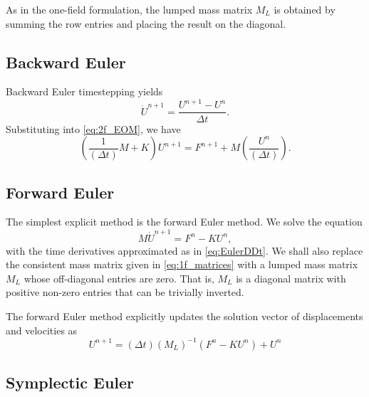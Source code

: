 \documentclass[12pt]{article}
\newcommand{\inverse}[1]{\ensuremath{{#1}^{-1}}} %
\begin{document}
As in the one-field formulation, the lumped mass matrix $M_L$ is obtained
by summing the row entries and placing the result on the diagonal.

\subsection{Backward Euler}

Backward Euler timestepping yields
\begin{equation}
\dot{U}^{n+1} = \frac{U^{n+1} - U^n}{\Delta t}.
\end{equation}
Substituting into \eqref{eq:2f_EOM}, we have
\begin{equation}
\left(\frac{1}{(\Delta t)} M + K \right) U^{n+1} = 
F^{n+1} + M \left( \frac{U^n}{(\Delta t)} \right).
\end{equation}

\subsection{Forward Euler}

The simplest explicit method is the forward Euler method.
We solve the equation
\begin{equation}
M\dot{U}^{n+1} = F^n - KU^n,
\end{equation}
with the time derivatives approximated as in \eqref{eq:EulerDDt}.
We shall also replace the consistent mass matrix given in \eqref{eq:1f_matrices}
with a lumped mass matrix $M_L$ whose off-diagonal entries are zero.
That is, $M_L$ is a diagonal matrix with positive non-zero entries
that can be trivially inverted.

The forward Euler method explicitly updates the solution vector of 
displacements and velocities as
\begin{equation}
\label{eq:ForwardEuler}
U^{n+1} = (\Delta t) \inverse{(M_L)}(F^n - K U^n) + U^n
\end{equation}

\subsection{Symplectic Euler}
\end{document}
